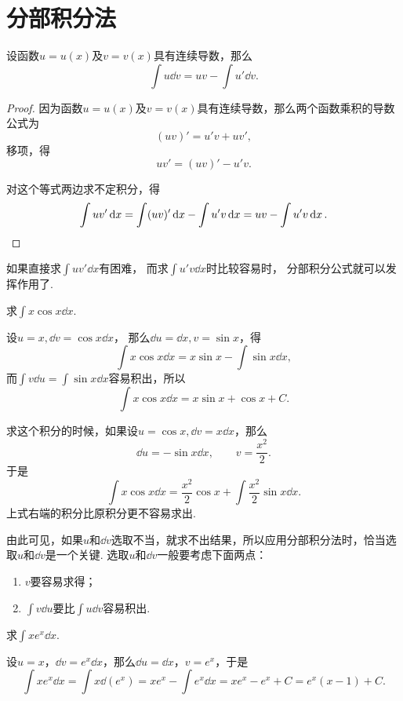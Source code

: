 \section{分部积分法}
\begin{theorem}[分部积分公式]
设函数\(u=u(x)\)及\(v=v(x)\)具有连续导数，那么\[
\int u \dd{v} = uv - \int u' \dd{v}.
\]
\begin{proof}
因为函数\(u=u(x)\)及\(v=v(x)\)具有连续导数，那么两个函数乘积的导数公式为\[
(uv)' = u'v + uv',
\]移项，得\[
uv' = (uv)' - u'v.
\]

对这个等式两边求不定积分，得\[
\int u v' \dd{x} = \int (uv)' \dd{x} - \int u' v \dd{x}
= uv - \int u' v \dd{x}.
\qedhere
\]
\end{proof}
\end{theorem}
如果直接求\(\int u v' \dd{x}\)有困难，
而求\(\int u' v \dd{x}\)时比较容易时，
分部积分公式就可以发挥作用了.

\begin{example}
求\(\int x \cos x \dd{x}\).
\begin{solution}
设\(u = x, \dd{v} = \cos x \dd{x}\)，
那么\(\dd{u} = \dd{x}, v = \sin x\)，得\[
	\int x \cos x \dd{x}
	= x \sin x - \int \sin x \dd{x},
\]
而\(\int v \dd{u} = \int \sin x \dd{x}\)容易积出，所以\[
	\int x \cos x \dd{x}
	= x \sin x + \cos x + C.
\]

求这个积分的时候，如果设\(u = \cos x, \dd{v} = x \dd{x}\)，那么\[
\dd{u} = -\sin x \dd{x}, \qquad v = \frac{x^2}{2}.
\]于是\[
\int x \cos x \dd{x} = \frac{x^2}{2} \cos x + \int \frac{x^2}{2} \sin x \dd{x}.
\]上式右端的积分比原积分更不容易求出.
\end{solution}
\end{example}
由此可见，如果\(u\)和\(\dd{v}\)选取不当，就求不出结果，所以应用分部积分法时，恰当选取\(u\)和\(\dd{v}\)是一个关键.
选取\(u\)和\(\dd{v}\)一般要考虑下面两点：\begin{enumerate}
\item \(v\)要容易求得；
\item \(\int v \dd{u}\)要比\(\int u \dd{v}\)容易积出.
\end{enumerate}

\begin{example}
求\(\int x e^x \dd{x}\).
\begin{solution}
设\(u = x\)，\(\dd{v} = e^x \dd{x}\)，那么\(\dd{u} = \dd{x}\)，\(v = e^x\)，于是\[
\int x e^x \dd{x}
= \int x \dd(e^x)
= x e^x - \int e^x \dd{x}
= x e^x - e^x + C
= e^x (x - 1) + C.
\]
\end{solution}
\end{example}

